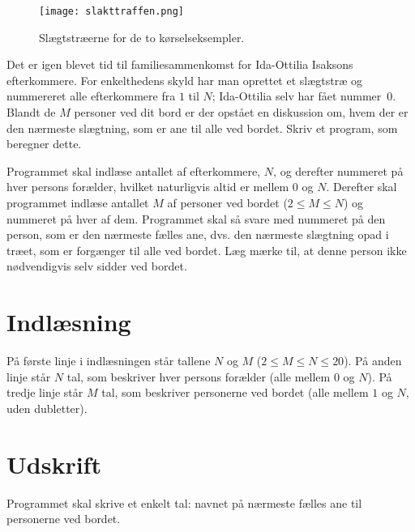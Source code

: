 \begin{figure}[h!]
  \centering
  \texttt{[image: slakttraffen.png]}
  \caption{Slægtstræerne for de to kørselseksempler.}
\end{figure}

Det er igen blevet tid til familiesammenkomst for  Ida-Ottilia Isaksons efterkommere.
For enkelthedens skyld har man oprettet et slægtstræ og nummereret alle efterkommere fra $1$ til $N$; Ida-Ottilia selv har fået nummer~$0$.
Blandt de $M$ personer ved dit bord er der opstået en diskussion om, hvem der er den nærmeste slægtning, som er ane til alle ved bordet.
Skriv et program, som beregner dette.

Programmet skal indlæse antallet af efterkommere, $N$, og derefter nummeret på hver persons forælder, hvilket naturligvis altid er mellem $0$ og $N$.
Derefter skal programmet indlæse antallet $M$ af personer ved bordet ($2 \le M \le N$) og nummeret på hver af dem.
Programmet skal så svare med nummeret på den person, som er den nærmeste fælles ane, dvs. den nærmeste slægtning opad i træet, som er forgænger til alle ved bordet.
Læg mærke til, at denne person ikke nødvendigvis selv sidder ved bordet.

\section*{Indlæsning}
På første linje i indlæsningen står tallene $N$ og $M$ ($2 \le M \le N \le 20$).
På anden linje står $N$ tal, som beskriver hver persons forælder (alle mellem $0$ og $N$).
På tredje linje står $M$ tal, som beskriver personerne ved bordet (alle mellem $1$ og $N$, uden dubletter).

\section*{Udskrift}
Programmet skal skrive et enkelt tal: navnet på nærmeste fælles ane til personerne ved bordet.
